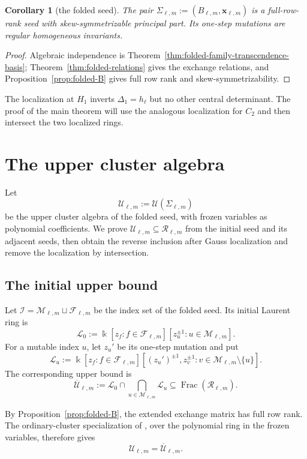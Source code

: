 \documentclass[11pt]{amsart}
\newtheorem{corollary}[theorem]{Corollary}
\theoremstyle{definition}
\theoremstyle{remark}
\newcommand{\kk}{\Bbbk}
\newcommand{\cR}{\mathcal R}
\newcommand{\cU}{\mathcal U}
\newcommand{\Frac}{\operatorname{Frac}}
\begin{document}
\begin{corollary}[the folded seed]
\label{cor:folded-seed}
The pair
$\Sigma_{\ell,m}:=(B_{\ell,m},\mathbf x_{\ell,m})$
is a full-row-rank seed with skew-symmetrizable principal part.  Its
one-step mutations are regular homogeneous invariants.
\end{corollary}

\begin{proof}
Algebraic independence is Theorem~\ref{thm:folded-family-transcendence-basis};
Theorem~\ref{thm:folded-relations} gives the exchange relations, and
Proposition~\ref{prop:folded-B} gives full row rank and
skew-symmetrizability.
\end{proof}

The localization at $H_1$ inverts $\Delta_1=h_\ell$ but no
other central determinant.  The proof of the main theorem will use the
analogous localization for $C_2$ and then intersect the two localized
rings.

\section{The upper cluster algebra}
\label{sec:upper-cluster-equality}

Let
\[ \cU_{\ell,m}:=\mathcal U(\Sigma_{\ell,m}) \]
be the upper cluster algebra of the folded seed, with frozen variables as
polynomial coefficients.  We prove $\cU_{\ell,m}\subseteq\cR_{\ell,m}$ from the initial seed and
its adjacent seeds, then obtain the reverse inclusion
after Gauss localization and remove the localization by intersection.

\subsection{The initial upper bound}
\label{subsec:upper-bound-regularity}

Let
$\mathscr I=\mathscr M_{\ell,m}\sqcup\mathscr F_{\ell,m}$
be the index set of the folded seed.  Its initial Laurent ring is
\[ \mathcal L_0 :=\kk[z_f:f\in\mathscr F_{\ell,m}] [z_u^{\pm1}:u\in\mathscr M_{\ell,m}]. \]
For a mutable index $u$, let $z_u'$ be its one-step mutation and put
\[ \mathcal L_u :=\kk[z_f:f\in\mathscr F_{\ell,m}] [(z_u')^{\pm1},z_v^{\pm1}:v\in\mathscr M_{\ell,m}\setminus\{u\}]. \]
The corresponding upper bound is
\[ \overline{\cU}_{\ell,m}:=\mathcal L_0\cap\bigcap_{u\in\mathscr M_{\ell,m}}\mathcal L_u\subseteq\Frac(\cR_{\ell,m}). \]

By Proposition~\ref{prop:folded-B}, the extended exchange matrix has full
row rank.  The ordinary-cluster specialization of
\cite[Theorem~3.11]{GSV}, over the polynomial ring in the frozen variables,
therefore gives
\begin{equation}
 \cU_{\ell,m}=\overline{\cU}_{\ell,m}.
 \label{eq:upper-bound-equality}
\end{equation}
\end{document}
